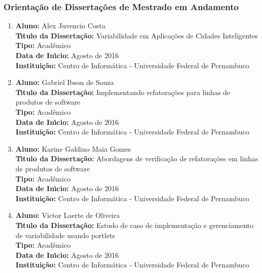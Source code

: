 \documentclass[a4paper,oneside,10pt]{article}
\begin{document}
\subsubsection{Orienta\c{c}\~{a}o de Disserta\c{c}\~{o}es de Mestrado em Andamento}
\vspace{0.3cm}

\begin{enumerate}
\renewcommand{\labelenumi}{{\large\bfseries\arabic{enumi}.}}

\item       \textbf{Aluno:} Alex Juvencio Costa \mbox{}\\
            \textbf{T\'{\i}tulo da Disserta\c{c}\~{a}o:} Variabilidade em Aplicações de Cidades Inteligentes\\
            \textbf{Tipo:} Acadêmico \\%
            \textbf{Data de In\'{\i}cio:} Agosto de 2016\\
            \textbf{Institui\c{c}\~{a}o:} Centro de Informática - Universidade Federal de Pernambuco

\item       \textbf{Aluno:} Gabriel Ibson de Souza \mbox{}\\
            \textbf{T\'{\i}tulo da Disserta\c{c}\~{a}o:} Implementando refatorações para linhas de produtos de software\\
            \textbf{Tipo:} Acadêmico\\
            \textbf{Data de In\'{\i}cio:} Agosto de 2016\\
            \textbf{Institui\c{c}\~{a}o:} Centro de Informática - Universidade Federal de Pernambuco

\item       \textbf{Aluno:} Karine Galdino Maia Gomes \mbox{}\\
            \textbf{T\'{\i}tulo da Disserta\c{c}\~{a}o:} Abordagens de verificação de refatorações em linhas de produtos de software\\
            \textbf{Tipo:} Acadêmico\\
            \textbf{Data de In\'{\i}cio:} Agosto de 2016\\
            \textbf{Institui\c{c}\~{a}o:} Centro de Informática - Universidade Federal de Pernambuco

\item       \textbf{Aluno:} Victor Laerte de Oliveira \mbox{}\\
            \textbf{T\'{\i}tulo da Disserta\c{c}\~{a}o:} Estudo de caso de implementação e gerenciamento de variabilidade usando portlets\\
            \textbf{Tipo:} Acadêmico\\
            \textbf{Data de In\'{\i}cio:} Agosto de 2016\\
            \textbf{Institui\c{c}\~{a}o:} Centro de Informática - Universidade Federal de Pernambuco
            

\end{enumerate}
\end{document}
